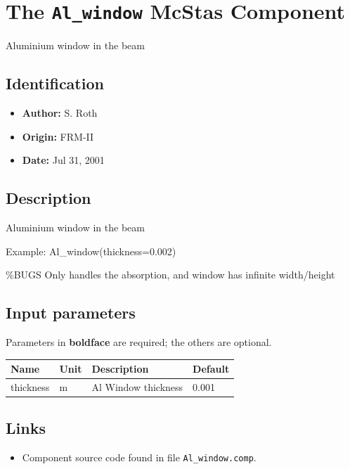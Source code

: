 \section{The \texttt{Al\_window} McStas Component}
Aluminium window in the beam

\subsection*{Identification}
\begin{itemize}
  \item \textbf{Author:} S. Roth
  \item \textbf{Origin:} FRM-II
  \item \textbf{Date:} Jul 31, 2001
\end{itemize}

\subsection*{Description}
Aluminium window in the beam

Example: Al\_window(thickness=0.002)

\%BUGS Only handles the absorption, and window has infinite width/height

\subsection*{Input parameters}
Parameters in \textbf{boldface} are required; the others are optional.

\begin{longtable}{p{}p{}p{}p{}}
\toprule
\textbf{Name} & \textbf{Unit} & \textbf{Description} & \textbf{Default} \\
\midrule
\endhead
thickness & m & Al Window thickness & 0.001 \\
\bottomrule
\end{longtable}

\subsection*{Links}
\begin{itemize}
  \item Component source code found in file \texttt{Al\_window.comp}.
\end{itemize}
